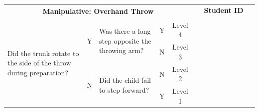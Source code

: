 \documentclass[
  letterpaper,
  DIV=11,
  numbers=noendperiod]{scrartcl}
\begin{document}
\begin{tabular}{|p{5.5cm}|c|p{5.5cm}|c|c|*{9}{p{1.07cm}|}}
\hline
\multicolumn{5}{|c|}{\multirow{2}{*}{\centering \textbf{Manipulative: Overhand Throw}}} & \multicolumn{9}{c|}{\textbf{Student ID}} \\ 
\cline{6-14}
\multicolumn{5}{|c|}{} & & & & & & & & & \\
\hline
\multirow{4}{5.5cm}{\raggedright {\footnotesize Did the trunk rotate to the side of the throw during preparation?}} 
& \multirow{2}{*}{\footnotesize Y} 
& \multirow{2}{5.5cm}{\raggedright {\footnotesize Was there a long step opposite the throwing arm?}} & {\footnotesize Y} & {\footnotesize Level 4} & & & & & & & & & \\
\cline{4-14}
& & & {\footnotesize N} & {\footnotesize Level 3} & & & & & & & & & \\
\cline{2-14}
& \multirow{2}{*}{\footnotesize N} & \multirow{2}{6cm}{\raggedright {\footnotesize Did the child fail to step forward?}} & {\footnotesize N} & {\footnotesize Level 2} & & & & & & & & & \\
\cline{4-14}
& & & {\footnotesize Y} & {\footnotesize Level 1} & & & & & & & & & \\
\hline
\end{tabular}

\vspace{.5em}
\end{document}
